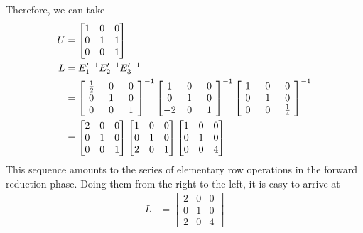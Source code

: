\begin{solution}
Therefore, we can take
\begin{align*}
U &= 
\begin{bmatrix}
1 & 0 & 0 \\
0 & 1 & 1 \\
0 & 0 & 1 
\end{bmatrix}
\\
L &= E_1'^{-1}E_2'^{-1}E_3'^{-1} \\
&=
\left[\begin{array}{@{\,}wc{10pt}wc{10pt}wc{10pt}@{\,}}
\frac{1}{2} & 0 & 0 \\
0 & 1 & 0 \\
0 & 0 & 1 
\end{array}\right]^{-1}
\left[\begin{array}{@{\,}wc{10pt}wc{10pt}wc{10pt}@{\,}}
1 & 0 & 0 \\
0 & 1 & 0 \\
-2 & 0 & 1 
\end{array}\right]^{-1}
\left[\begin{array}{@{\,}wc{10pt}wc{10pt}wc{10pt}@{\,}}
1 & 0 & 0 \\
0 & 1 & 0 \\
0 & 0 & \frac{1}{4} 
\end{array}\right]
^{-1} \\
&= \begin{bmatrix}
2 & 0 & 0 \\
0 & 1 & 0 \\
0 & 0 & 1 
\end{bmatrix}
\begin{bmatrix}
1 & 0 & 0 \\
0 & 1 & 0 \\
2 & 0 & 1 
\end{bmatrix}
\begin{bmatrix}
1 & 0 & 0 \\
0 & 1 & 0 \\
0 & 0 & 4 
\end{bmatrix}
\end{align*}
This sequence amounts to the series of elementary row operations in the forward reduction phase. Doing them from the right to the left, it is easy to arrive at
\begin{align*}
L &=
\begin{bmatrix}
2 & 0 & 0 \\
0 & 1 & 0 \\
2 & 0 & 4
\end{bmatrix}
\end{align*}
\end{solution}

